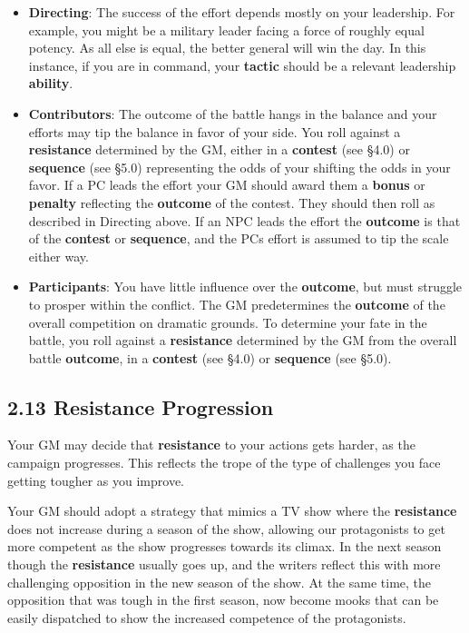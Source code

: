 \documentclass[
  11pt,
]{article}
\providecommand{\tightlist}{%
  \setlength{\itemsep}{0pt}\setlength{\parskip}{0pt}}
\begin{document}
\begin{itemize}
\tightlist
\item
  \textbf{Directing}: The success of the effort depends mostly on your
  leadership. For example, you might be a military leader facing a force
  of roughly equal potency. As all else is equal, the better general
  will win the day. In this instance, if you are in command, your
  \textbf{tactic} should be a relevant leadership \textbf{ability}.
\item
  \textbf{Contributors}: The outcome of the battle hangs in the balance
  and your efforts may tip the balance in favor of your side. You roll
  against a \textbf{resistance} determined by the GM, either in a
  \textbf{contest} (see §4.0) or \textbf{sequence} (see §5.0)
  representing the odds of your shifting the odds in your favor. If a PC
  leads the effort your GM should award them a \textbf{bonus} or
  \textbf{penalty} reflecting the \textbf{outcome} of the contest. They
  should then roll as described in Directing above. If an NPC leads the
  effort the \textbf{outcome} is that of the \textbf{contest} or
  \textbf{sequence}, and the PCs effort is assumed to tip the scale
  either way.
\item
  \textbf{Participants}: You have little influence over the
  \textbf{outcome}, but must struggle to prosper within the conflict.
  The GM predetermines the \textbf{outcome} of the overall competition
  on dramatic grounds. To determine your fate in the battle, you roll
  against a \textbf{resistance} determined by the GM from the overall
  battle \textbf{outcome}, in a \textbf{contest} (see §4.0) or
  \textbf{sequence} (see §5.0).
\end{itemize}

\hypertarget{resistance-progression}{%
\subsection{2.13 Resistance Progression}\label{resistance-progression}}

Your GM may decide that \textbf{resistance} to your actions gets harder,
as the campaign progresses. This reflects the trope of the type of
challenges you face getting tougher as you improve.

Your GM should adopt a strategy that mimics a TV show where the
\textbf{resistance} does not increase during a season of the show,
allowing our protagonists to get more competent as the show progresses
towards its climax. In the next season though the \textbf{resistance}
usually goes up, and the writers reflect this with more challenging
opposition in the new season of the show. At the same time, the
opposition that was tough in the first season, now become mooks that can
be easily dispatched to show the increased competence of the
protagonists.
\end{document}
